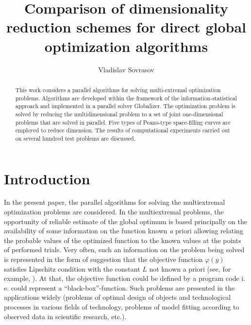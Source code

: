 \documentclass[procedia]{easychair}
\title{Comparison of dimensionality reduction schemes for direct global optimization
algorithms}
\author {
Vladislav Sovrasov
}
\institute  {
  Lobachevsky State University of Nizhni Novgorod, Nizhni Novgorod, Russia
  \email{sovrasov.vlad@gmail.com}\\
}
\begin{document}
\maketitle


\begin{abstract}
This work considers a parallel algorithms for solving multi-extremal optimization problems.
Algorithms are developed within the framework of the information-statistical approach and
implemented in a parallel solver Globalizer. The optimization problem is solved by reducing
the multidimensional problem to a set of joint one-dimensional problems that are solved in
parallel. Five types of Peano-type space-filling curves are employed to reduce dimension. The
results of computational experiments carried out on several hundred test problems are discussed.
\end{abstract}



%
%


\section{Introduction}
\label{sec:intro}

In the present paper, the parallel algorithms for solving the multiextremal optimization problems
are considered. In the multiextremal problems, the opportunity of reliable estimate of the global
optimum is based principally on the availability of some information on the function known
{\textit a priori} allowing relating the probable values of the optimized function to the known
values at the points of performed trials. Very often, such an information on the problem being
solved is represented in the form of suggestion that the objective function $\varphi(y)$ satisfies
Lipschitz condition with the constant $L$ not known a priori (see, for example,
\cite{Jones2009,Gablonsky2001,Evtushenko2013}). At that, the objective function could be defined by a
program code i. e. could represent a ``black-box''-function. Such problems are presented in the
applications widely (problems of optimal design of objects and technological processes in
various fields of technology, problems of model fitting according to observed data in scientific
research, etc.).
\end{document}
